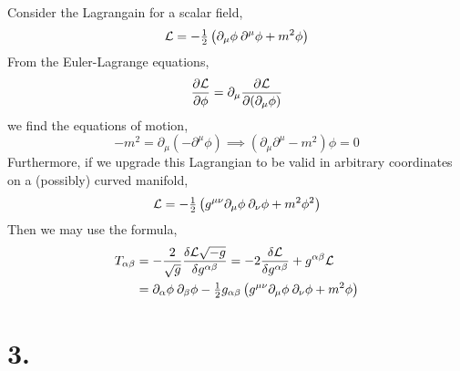 \documentclass[12pt]{article}
\begin{document}
Consider the Lagrangain for a scalar field, 
\[ \mathcal{L} = - \tfrac{1}{2} \left( \partial_\mu \phi \: \partial^\mu \phi + m^2 \phi \right) \]
From the Euler-Lagrange equations,
\[ \frac{\partial{\mathcal{L}}}{\partial{\phi}} = \partial_\mu \frac{\partial{\mathcal{L}}}{\partial{(\partial_\mu \phi)}} \]
we find the equations of motion,
\[ - m^2 = \partial_\mu \left( - \partial^\mu \phi \right) \implies (\partial_\mu \partial^\mu - m^2) \phi = 0 \]
Furthermore, if we upgrade this Lagrangian to be valid in arbitrary coordinates on a (possibly) curved manifold,
\[ \mathcal{L} = - \tfrac{1}{2} \left( g^{\mu \nu} \partial_\mu \phi \: \partial_\nu \phi + m^2 \phi^2 \right) \]
Then we may use the formula,
\begin{align*}
T_{\alpha \beta} & = - \frac{2}{\sqrt{g}} \frac{\delta \mathcal{L} \sqrt{-g}}{\delta g^{\alpha \beta}} = - 2 \frac{\delta \mathcal{L}}{\delta g^{\alpha \beta}} + g^{\alpha \beta} \mathcal{L} 
\\
& = \partial_\alpha \phi \: \partial_\beta \phi -  \tfrac{1}{2} g_{\alpha \beta} \left( g^{\mu \nu} \partial_\mu \phi \: \partial_\nu \phi + m^2 \phi \right)
\end{align*}

\section*{3. }
\end{document}
